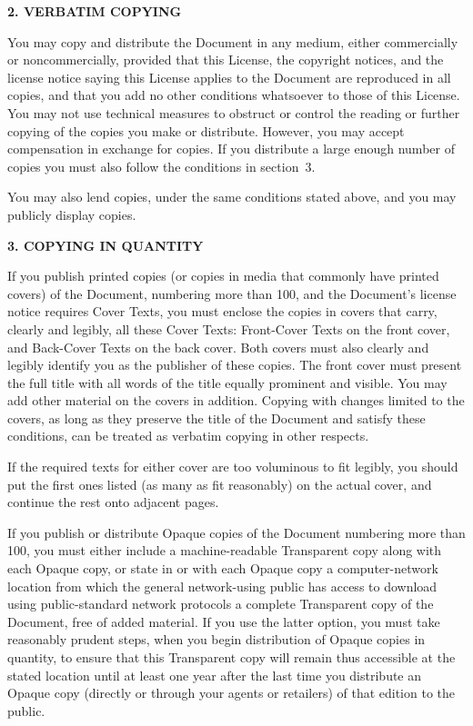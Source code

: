 \documentclass[a4paper,spanish,12pt]{book}
\begin{document}
\begin{center}
{\Large\bf 2. VERBATIM COPYING\par}
\end{center}

You may copy and distribute the Document in any medium, either
commercially or noncommercially, provided that this License, the
copyright notices, and the license notice saying this License applies
to the Document are reproduced in all copies, and that you add no other
conditions whatsoever to those of this License.  You may not use
technical measures to obstruct or control the reading or further
copying of the copies you make or distribute.  However, you may accept
compensation in exchange for copies.  If you distribute a large enough
number of copies you must also follow the conditions in section~3.

You may also lend copies, under the same conditions stated above, and
you may publicly display copies.


\begin{center}
{\Large\bf 3. COPYING IN QUANTITY\par}
\end{center}


If you publish printed copies (or copies in media that commonly have
printed covers) of the Document, numbering more than 100, and the
Document's license notice requires Cover Texts, you must enclose the
copies in covers that carry, clearly and legibly, all these Cover
Texts: Front-Cover Texts on the front cover, and Back-Cover Texts on
the back cover.  Both covers must also clearly and legibly identify
you as the publisher of these copies.  The front cover must present
the full title with all words of the title equally prominent and
visible.  You may add other material on the covers in addition.
Copying with changes limited to the covers, as long as they preserve
the title of the Document and satisfy these conditions, can be treated
as verbatim copying in other respects.

If the required texts for either cover are too voluminous to fit
legibly, you should put the first ones listed (as many as fit
reasonably) on the actual cover, and continue the rest onto adjacent
pages.

If you publish or distribute Opaque copies of the Document numbering
more than 100, you must either include a machine-readable Transparent
copy along with each Opaque copy, or state in or with each Opaque copy
a computer-network location from which the general network-using
public has access to download using public-standard network protocols
a complete Transparent copy of the Document, free of added material.
If you use the latter option, you must take reasonably prudent steps,
when you begin distribution of Opaque copies in quantity, to ensure
that this Transparent copy will remain thus accessible at the stated
location until at least one year after the last time you distribute an
Opaque copy (directly or through your agents or retailers) of that
edition to the public.
\end{document}
